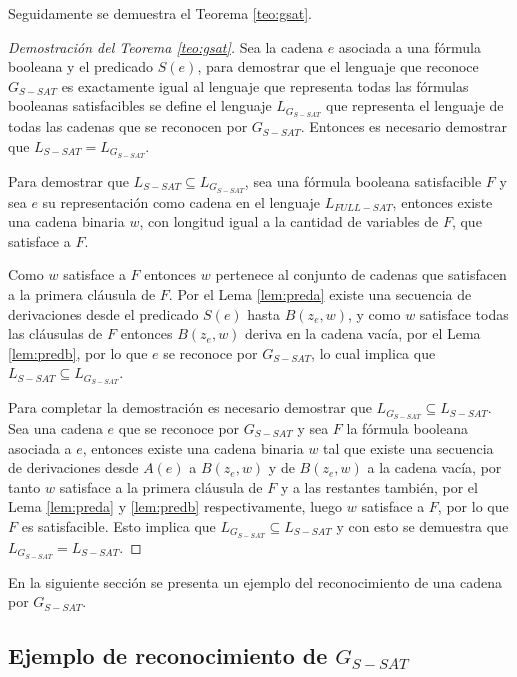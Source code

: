 \documentclass[12pt]{article}
\begin{document}
Seguidamente se demuestra el Teorema \ref{teo:gsat}.

\begin{proof}[Demostración del Teorema \ref{teo:gsat}]
    Sea la cadena $e$ asociada a una fórmula booleana y el predicado $S(e)$, para demostrar que el lenguaje que reconoce $G_{S-SAT}$ es exactamente igual al lenguaje que representa todas las fórmulas booleanas satisfacibles se define el lenguaje $L_{G_{S-SAT}}$ que representa el lenguaje de todas las cadenas que se reconocen por $G_{S-SAT}$. Entonces es necesario demostrar que $L_{S-SAT}=L_{G_{S-SAT}}$.
    
    Para demostrar que $L_{S-SAT}\subseteq L_{G_{S-SAT}}$, sea una fórmula booleana satisfacible $F$ y sea $e$ su representación como cadena en el lenguaje $L_{FULL-SAT}$, entonces existe una cadena binaria $w$, con longitud igual a la cantidad de variables de $F$, que satisface a $F$.
    
    Como $w$ satisface a $F$ entonces $w$ pertenece al conjunto de cadenas que satisfacen a la primera cláusula de $F$. Por el Lema \ref{lem:preda} existe una secuencia de derivaciones desde el predicado $S(e)$ hasta $B(z_e,w)$, y como $w$ satisface todas las cláusulas de $F$ entonces $B(z_e,w)$ deriva en la cadena vacía, por el Lema \ref{lem:predb}, por lo que $e$ se reconoce por $G_{S-SAT}$, lo cual implica que $L_{S-SAT}\subseteq L_{G_{S-SAT}}$.
    
    Para completar la demostración es necesario demostrar que $ L_{G_{S-SAT}}\subseteq L_{S-SAT}$. Sea una cadena $e$ que se reconoce por $G_{S-SAT}$ y sea $F$ la fórmula booleana asociada a $e$, entonces existe una cadena binaria $w$ tal que existe una secuencia de derivaciones desde $A(e)$ a $B(z_e,w)$ y de $B(z_e,w)$ a la cadena vacía, por tanto $w$ satisface a la primera cláusula de $F$ y a las restantes también, por el Lema \ref{lem:preda} y \ref{lem:predb} respectivamente, luego $w$ satisface a $F$, por lo que $F$ es satisfacible. Esto implica que $L_{G_{S-SAT}}\subseteq L_{S-SAT}$ y con esto se demuestra que $L_{G_{S-SAT}}= L_{S-SAT}$.
\end{proof}


En la siguiente sección se presenta un ejemplo del reconocimiento de una cadena por $G_{S-SAT}$.

\subsection{Ejemplo de reconocimiento de $G_{S-SAT}$}
\end{document}
